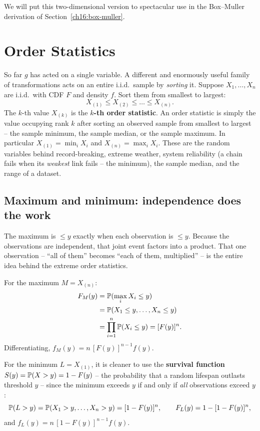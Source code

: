 We will put this two-dimensional version to spectacular use in the Box--Muller derivation
of Section~\ref{ch16:box-muller}.

\section{Order Statistics}
\label{ch16:order-stats}

So far $g$ has acted on a single variable. A different and enormously useful family of
transformations acts on an entire i.i.d.\ sample by \emph{sorting} it. Suppose
$X_1,\dots,X_n$ are i.i.d.\ with CDF $F$ and density $f$. Sort them from smallest to
largest:
\[
  X_{(1)} \le X_{(2)} \le \dots \le X_{(n)}.
\]
The $k$-th value $X_{(k)}$ is the \textbf{$k$-th order statistic}. An order statistic is
simply the value occupying rank $k$ after sorting an observed sample from smallest to largest --
the sample minimum, the sample median, or the sample maximum. In particular
$X_{(1)} = \min_i X_i$ and $X_{(n)} = \max_i X_i$. These are the random variables behind
record-breaking, extreme weather, system reliability (a chain fails when its
\emph{weakest} link fails -- the minimum), the sample median, and the range of a dataset.

\subsection{Maximum and minimum: independence does the work}

\begin{intuitionbox}
The maximum is $\le y$ exactly when each observation is $\le y$. Because the
observations are independent, that joint event factors into a product. That one
observation -- ``all of them'' becomes ``each of them, multiplied'' -- is the entire idea
behind the extreme order statistics.
\end{intuitionbox}

For the maximum $M = X_{(n)}$:
\begin{align*}
  F_M(y) &= \P(\max_i X_i \le y) \\
         &= \P(X_1\le y,\dots,X_n\le y) \\
         &= \prod_{i=1}^n \P(X_i\le y) = [F(y)]^n.
\end{align*}
Differentiating, $f_M(y) = n\,[F(y)]^{n-1} f(y)$.

For the minimum $L = X_{(1)}$, it is cleaner to use the \textbf{survival function}
$S(y) = \P(X > y) = 1 - F(y)$ -- the probability that a random lifespan outlasts threshold
$y$ -- since the minimum exceeds $y$ if and only if \emph{all} observations exceed $y$:
\[
  \P(L > y) = \P(X_1 > y,\dots,X_n > y) = [1-F(y)]^n,
  \qquad F_L(y) = 1 - [1-F(y)]^n,
\]
and $f_L(y) = n\,[1-F(y)]^{n-1} f(y)$.

